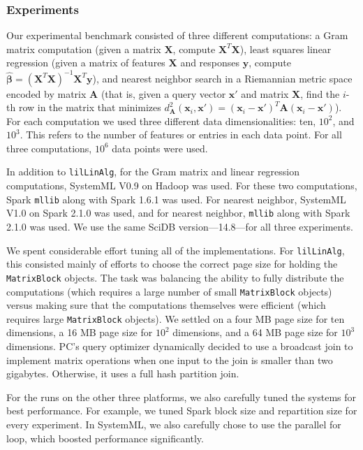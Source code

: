 \subsubsection {Experiments}

Our experimental benchmark consisted of three different computations:
a Gram matrix computation (given a matrix $\textbf{X}$, compute
$\textbf{X}^T \textbf{X}$), least squares linear regression (given a matrix of features $\textbf{X}$ and
responses $\textbf{y}$, compute 
$\hat{\pmb{\beta}} = (\textbf{X}^{T} \textbf{X})^{-1} \textbf{X}^{T} \textbf{y}$), and nearest
neighbor search in a Riemannian metric space \cite{lebanon2006metric} encoded by matrix $\textbf{A}$ (that is,
given a query vector
$\textbf{x}'$ and matrix $\textbf{X}$, find the $i$-th row in the matrix that minimizes 
$d_{\textbf{A}}^2(\textbf{x}_i, \textbf{x}') = 
(\textbf{x}_i - \textbf{x}')^T\textbf{A}(\textbf{x}_i - \textbf{x}')$).  
For each computation we used three different data dimensionalities: ten, $10^2$, and $10^3$.  This refers to
the number of features or entries in each data point. 
For
all three computations, 
$10^6$ data points were used. 

In addition to \texttt{lilLinAlg}, 
for the Gram matrix and linear regression computations, SystemML V0.9 on Hadoop was used.
For these two computations, Spark \texttt{mllib} along with
Spark 1.6.1 was used.  For
nearest neighbor, SystemML V1.0 on Spark 2.1.0 was used, and for
nearest neighbor, \texttt{mllib} along with Spark 2.1.0 was used. We
use the same SciDB version---14.8---for all three
experiments.

We spent considerable effort tuning all of the implementations.
For \texttt{lilLinAlg}, this consisted mainly of efforts to choose the correct page size for holding the
\texttt{MatrixBlock} objects.  The task was balancing the ability to fully distribute the computations
(which requires a large number of small \texttt{MatrixBlock} objects) versus making sure that the computations
themselves were efficient (which requires large \texttt{MatrixBlock} objects).  We settled on 
a four MB page size for ten dimensions, a 16 MB page
size for $10^2$ dimensions, and a 64 MB page size for $10^3$ dimensions. 
PC's query optimizer dynamically decided to use a
broadcast join to implement matrix operations when one input to the join is smaller than 
two
gigabytes.  Otherwise, it uses a full hash partition join.

For the runs on the other three platforms, we also carefully tuned the
systems for best performance. For example, we tuned Spark block size and repartition
size for every experiment. In SystemML, we also carefully chose to
use the parallel for loop, which boosted performance significantly.

